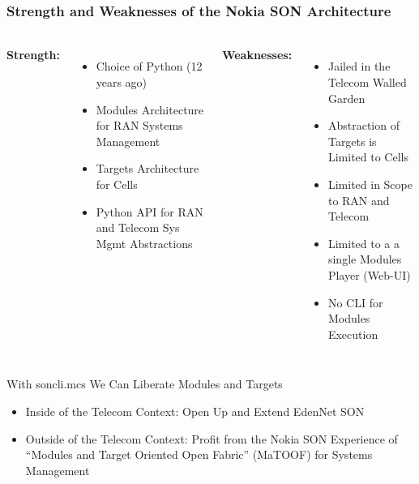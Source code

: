 \begin{verblatex}

\begin{frame}[fragile,plain,label=edenNetSonStrength]
    \frametitle{Strength and Weaknesses of the Nokia SON Architecture}
    \framesubtitle{}

\begin{small}
\begin{columns}[T]

\begin{center}
        \colorbox{blue!30}{\color{black} \textbf{Strength:}}
\end{center}

\begin{itemize}
  \item Choice of Python (12 years ago)
  \item Modules Architecture for RAN Systems Management
  \item Targets Architecture for Cells
  \item Python API for RAN and Telecom  Sys Mgmt Abstractions
\end{itemize}


   \begin{center}
      \colorbox{blue!60}{\color{white} \textbf{Weaknesses:}}
    \end{center}

    \begin{itemize}
      \item Jailed in the Telecom Walled Garden
      \item Abstraction of Targets is Limited to Cells
      \item Limited in Scope to RAN and Telecom
      \item Limited to a a single Modules Player (Web-UI)
      \item No CLI for Modules Execution

    \end{itemize}

\end{columns}
\end{small}

\begin{exampleblock}{With soncli.mcs We Can Liberate Modules and Targets}
  \begin{itemize}
    \item Inside of the Telecom Context:  Open Up and Extend EdenNet SON
    \item Outside of the Telecom Context: Profit from the Nokia SON Experience of ``Modules and Target Oriented Open Fabric''
          (MaTOOF) for Systems Management
  \end{itemize}
\end{exampleblock}



\end{frame}
\end{verblatex}
